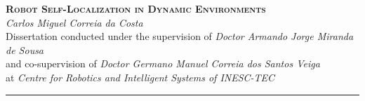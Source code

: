 \documentclass[9pt,a4paper]{extarticle}
\begin{document}
\begin{center}
  \huge{\textbf{\textsc{Robot Self-Localization in Dynamic Environments}}}\\[4mm]
  \Large{\emph{Carlos Miguel Correia da Costa}}\\[2mm]
  \normalsize{Dissertation conducted under the supervision of \emph{Doctor Armando Jorge Miranda de Sousa}\\and co-supervision of \emph{Doctor Germano Manuel Correia dos Santos Veiga}}\\
  \normalsize{at \emph{Centre for Robotics and Intelligent Systems of INESC-TEC}}
\end{center}

\thispagestyle{empty}
\vspace*{-4mm}\noindent\rule{\textwidth}{0.4pt}\vspace*{4mm}



\end{document}
